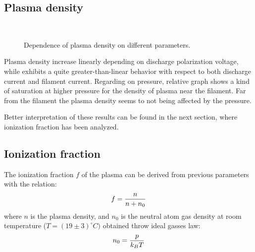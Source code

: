 \documentclass[11pt,a4 paper]{article}
\let\oldfrac\frac
\renewcommand{\frac}[3][d]{\ifthenelse{\equal{#1}{d}}{\oldfrac{#2}{#3}}{\nicefrac{#2}{#3}}}
\begin{document}
\subsection{Plasma density}
\begin{figure}[H]
\\%
 \caption{Dependence of plasma density on different parameters.}\label{fig:n}%
\end{figure}%
Plasma density increase linearly depending on discharge polarization voltage, while exhibits a quite greater-than-linear behavior with respect to both discharge current and filament current. Regarding on pressure, relative graph shows a kind of saturation at higher pressure for the density of plasma near the filament. Far from the filament the plasma density seems to not being affected by the pressure.

Better interpretation of these results can be found in the next section, where ionization fraction has been analyzed.


\subsection{Ionization fraction}
The ionization fraction $f$ of the plasma can be derived from previous parameters with the relation:
\[f=\frac n{n+n_0}\]
where $n$ is the plasma density, and $n_0$ is the neutral atom gas density at room temperature ($T=(19\pm3)^\circ C)$ obtained throw ideal gasses law:
\[n_0=\frac p{k_BT}\]
\end{document}
